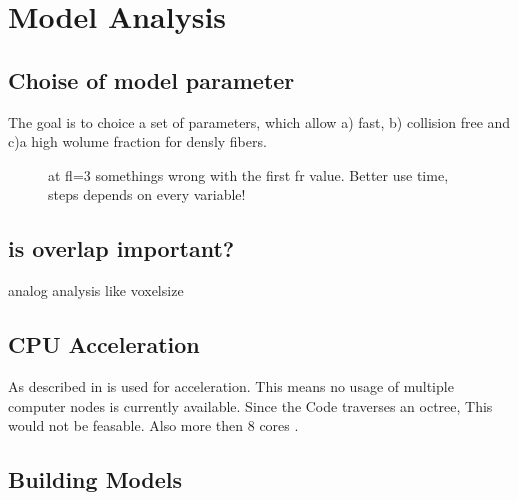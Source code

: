 \chapter{Model Analysis}
\label{cha:model_analysis}
% 
\section{Choise of model parameter}
% 
The goal is to choice a set of parameters, which allow a) fast, b) collision free and c)a high wolume fraction for densly fibers. 
% 
\begin{figure}[!tb]
\centering
{}
\caption{at fl=3 somethings wrong with the first fr value. Better use time, steps depends on every variable!}
\end{figure}
% 
\section{is overlap important?}
% 
analog analysis like voxelsize
% 
\section{CPU Acceleration}
% 
As described in \dummy \openmp is used for acceleration. This means no usage of multiple computer nodes is currently available. Since the Code traverses an octree, This would not be feasable. Also more then 8 cores \dummy.
% 
\section{Building Models}
% 
\tikzexternaldisable
% 
\begin{figure}[!tb]
\centering
\caption{}
\end{figure}
% 
\begin{figure}[!tb]
\centering
{}
\caption{}
\end{figure}
% 
\tikzexternalenable